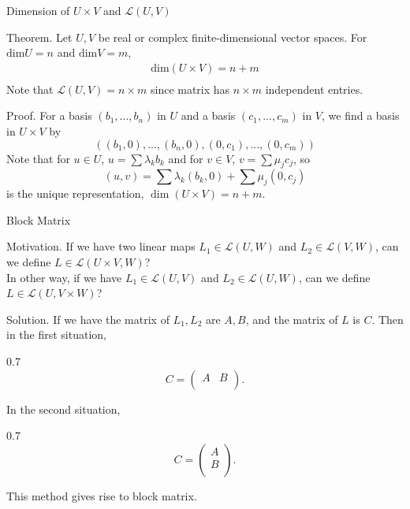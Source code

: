 \documentclass[hyperref={pdfpagelabels=true}]{beamer}
\renewcommand{\L}{\mathcal{L}}
\newcommand{\<}{\langle}
\renewcommand{\>}{\rangle}
\newenvironment{shrinkeq}[1]%
{ \bgroup
  \addtolength\abovedisplayshortskip{#1}
  \addtolength\abovedisplayskip{#1}
  \addtolength\belowdisplayshortskip{#1}
  \addtolength\belowdisplayskip{#1}}
{\egroup\ignorespacesafterend}
\begin{document}
\begin{frame}{Dimension of $U \times V$ and $\L(U,V)$}
    \begin{block}{Theorem.}
        Let $U,V$ be real or complex finite-dimensional vector spaces. For $\text{dim}U = n$ and $\text{dim}V = m$,
        \begin{shrinkeq}{-0.5em}
        \[
            \begin{aligned}
                \text{dim}(U \times V) = n+m \\
            \end{aligned}
        \]
        \end{shrinkeq}
        Note that $\L(U,V) = n \times m$ since matrix has $n \times m$ independent entries.
    \end{block}
    \begin{block}{Proof.}
        For a basis $(b_{1},...,b_{n})$ in $U$ and a basis $(c_{1},...,c_{m})$ in $V$, we find a basis in $U \times V$ by 
        \[((b_{1},0),...,(b_{n},0),(0,c_{1}),...,(0,c_{m}))\]
        Note that for $u \in U$, $u = \sum \lambda_{k}b_{k}$ and for $v \in V$, $v = \sum \mu_{j}c_{j}$, so 
        \[(u,v) = \sum \lambda_{k}(b_{k},0)+ \sum \mu_{j}(0,c_{j})\]
        is the unique representation, $\dim(U \times V) = n+m$.
    \end{block}
\end{frame}
\begin{frame}{Block Matrix}
    \begin{block}{Motivation.}
        If we have two linear maps $L_{1} \in \L(U,W)$ and $L_{2} \in \L(V,W)$, can we define $L \in \L(U \times V,W)$? \\
        In other way, if we have $L_{1} \in \L(U,V)$ and $L_{2} \in \L(U,W)$, can we define $L \in \L(U,V \times W)$?
    \end{block}
    \begin{block}{Solution.}
        If we have the matrix of $L_{1},L_{2}$ are $A,B$, and the matrix of $L$ is $C$. Then in the first situation,
        \begin{spacing}{0.7}
        \[C = 
        \begin{pmatrix}
            A & B\\
        \end{pmatrix}.
        \]
        \end{spacing}
        In the second situation,
        \begin{spacing}{0.7}
        \[C = 
        \begin{pmatrix}
            A\\
            B\\
        \end{pmatrix}.
        \]
    \end{spacing}
        This method gives rise to block matrix.
    \end{block}
\end{frame}
\end{document}
